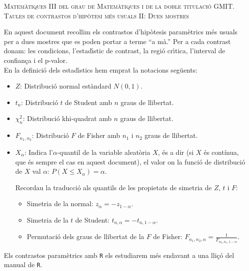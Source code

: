 \documentclass{article}
\begin{document}

\newcommand{\pp}[1]{P(#1\right)}
\newcommand{\vegeu}[1]{{(\footnotesize vegeu (#1))}}
\renewcommand{\thecas}{\Roman{cas}}
\newcommand{\posacas}{\addtocounter{cas}{1}{\bf \thecas}}


\begin{center}
\textsc{Matemàtiques III del grau de Matemàtiques i de la doble titulació GMIT.\\[0.5ex]  Taules de contrastos d'hip\`otesi m\'es usuals II: Dues mostres}
\end{center}
\vspace*{2cm}

\noindent En aquest document recollim els contrastos d'hip\`otesis param\`etrics m\'es usuals per a dues mostres  que es poden portar a terme ``a mà.'' Per a cada contrast donam: les condicions, l'estad\'{\i}stic
de contrast, la regi\'o cr\'{\i}tica, 
l'interval de confian\c ca i el p-valor.\\

En la definició dels estad\'{\i}stics hem emprat la notacions seg\"uents:
\begin{itemize}
\item  $Z$: {Distribuci\'o normal estàndard $N(0,1)$.} 
\item $t_n$: {Distribuci\'o
$t$ de Student amb $n$ graus de llibertat.} 
\item $\chi_n^2$: {Distribuci\'o
khi-quadrat amb $n$ graus de llibertat.} 
\item $F_{n_1,n_2}$: {Distribuci\'o $F$ de
Fisher  amb $n_1$ i $n_2$ graus de llibertat.}
\item $X_\alpha$: Indica l'$\alpha$-quantil de la variable aleat\`oria $X$, és a dir (si $X$ és contínua, que és sempre el cas en aquest document), el valor on la
funci\'o de distribuci\'o de $X$ val $\alpha$: $P(X\leq X_\alpha
)=\alpha$. 

Recordau la traducció als quantils de les propietats de simetria de $Z$, $t$ i $F$:
\begin{itemize}
\item Simetria de la normal: $z_\alpha = -z_{1-\alpha}.$
\item Simetria de la $t$ de Student: $t_{n,\alpha} = -t_{n,1-\alpha}.$
\item Permutació dels graus de llibertat de la $F$ de Fisher: $F_{n_1,n_2,\alpha}=\frac{1}{F_{n_2,n_1,1-\alpha}}.$
\end{itemize}
\end{itemize}
Els contrastos paramètrics amb \texttt{R} els estudiarem més endavant a una lliçó del manual de \texttt{R}.
\end{document}
